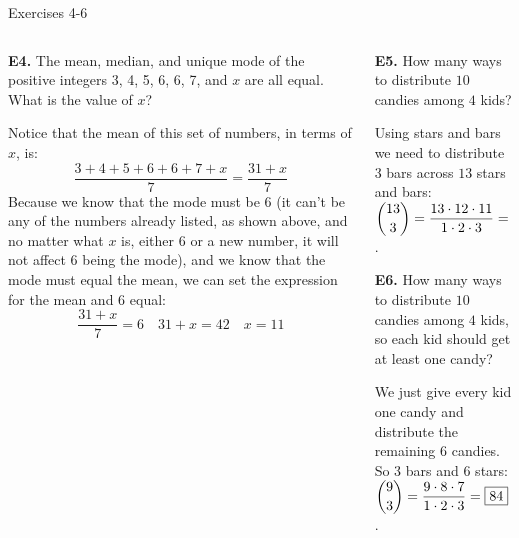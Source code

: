 \documentclass[9pt,aspectratio=169]{beamer}
\begin{document}
\begin{frame}{Exercises 4-6}
  \begin{columns}[T]
    \begin{column}{0.5\textwidth}
      \begin{problem}
        \textbf{E4.} The mean, median, and unique mode of the positive integers 3, 4, 5, 6, 6, 7, and $x$ are all equal. What is the value of $x$?
      \end{problem}
      Notice that the mean of this set of numbers, in terms of $x$, is:
      \[
        \frac{3+4+5+6+6+7+x}{7} = \frac{31+x}{7}
      \]
      Because we know that the mode must be $6$ (it can't be any of the numbers already listed, as shown above, and no matter what $x$ is, either $6$ or a new number, it will not affect $6$ being the mode), and we know that the mode must equal the mean, we can set the expression for the mean and $6$ equal:
      \[
        \frac{31+x}{7} = 6\quad 31+x = 42\quad x = \boxed{11}
      \]
    \end{column}
    \begin{column}{0.5\textwidth}
      \begin{problem}
        \textbf{E5.} How many ways to distribute $10$ candies among $4$ kids?
      \end{problem}
      Using stars and bars we need to distribute $3$ bars across $13$ stars and bars: $\dbinom{13}{3} = \dfrac{13 \cdot 12 \cdot 11}{1 \cdot 2 \cdot 3} = \boxed{286}$.
      \begin{problem}
        \textbf{E6.} How many ways to distribute $10$ candies among $4$ kids, so each kid should get at least one candy?
      \end{problem}
      We just give every kid one candy and distribute the remaining $6$ candies. So $3$ bars and $6$ stars: $\dbinom{9}{3} = \dfrac{9\cdot 8 \cdot 7}{1 \cdot 2 \cdot 3} = \boxed{84}$.
    \end{column}
  \end{columns}
\end{frame}
\end{document}
